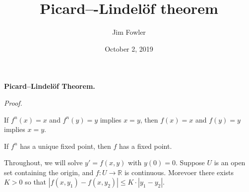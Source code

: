 \documentclass{homework}
\author{Jim Fowler}
\title{Picard–-Lindel\"of theorem}
\date{October 2, 2019}
\begin{document}
\maketitle

\textbf{Picard--Lindel\"of Theorem.}

\textit{Proof.}

\begin{problem}
  If $f^n(x) = x$ and $f^n(y) = y$ implies $x = y$, then $f(x) = x$ and $f(y) = y$ implies $x = y$.
\end{problem}

\begin{problem}
  If $f^n$ has a unique fixed point, then $f$ has a fixed point.
\end{problem}

Throughout, we will solve $y' = f(x,y)$ with $y(0) = 0$.
Suppose $U$ is an open set containing the origin, and $f : U \to \mathbb{R}$ is continuous.  Morevoer there exists $K > 0$ so that $|f(x,y_1) - f(x,y_2)| \leq K \cdot | y_1 - y_2 |$.

\end{document}
